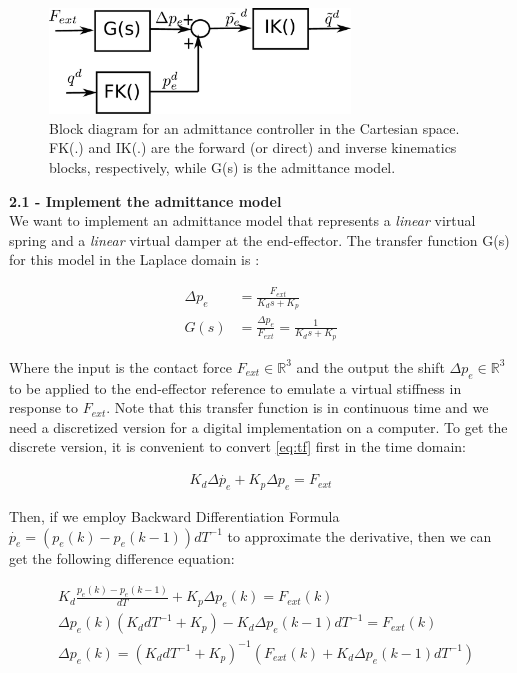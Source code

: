 \documentclass[11pt]{article}
\newcommand{\Rnum}{\mathbb{R}} %
\begin{document}
\begin{figure}[bht]
	\centering
	\includegraphics[width=8cm]{pics/admittanceControl.pdf}
	\caption{Block diagram for an admittance controller in the Cartesian space. FK(.) and IK(.) are the forward (or direct) and inverse kinematics blocks, respectively, while G(s) is the admittance model.}
	\label{fig:admittance}
\end{figure}

\textbf{2.1 - Implement the admittance model }\\
We want to implement an admittance model that represents a \textit{linear} virtual spring and a \textit{linear} virtual damper at the end-effector.
The transfer function G(s) for this model in the Laplace domain is :



\begin{align}
\label{eq:tf}
\Delta p_e &= \frac{ F_{ext} }{K_d s + K_p}\\
G(s)& = \frac{\Delta p_e}{F_{ext}} = \frac{ 1 }{K_d s + K_p} \nonumber
\end{align}


Where the input is the contact force $F_{ext}\in \Rnum^3$ and the output the shift  $\Delta p_e\in \Rnum^3$ to be applied to the end-effector reference to emulate a virtual stiffness in response to  $F_{ext}$. Note that this transfer function is in continuous time and we need a discretized version for a digital implementation on a computer. To get the discrete version, it is convenient to convert \eqref{eq:tf} first in the time domain:

\begin{align*}
K_d \Delta\dot{ p_e} + K_p{\Delta p_e}  =  F_{ext}  
\end{align*}
 
Then, if  we  employ Backward Differentiation Formula $\dot{p_e} = (p_e(k)- p_e(k-1))dT^{-1}$ to approximate the derivative, then we can get the following difference equation:

\begin{align*}
&K_d \frac{p_e(k)- p_e(k-1)}{dT}  + K_p \Delta p_e(k)  =  F_{ext}(k)  \\
&\Delta p_e(k) (K_d dT^{-1} + K_p ) - K_d \Delta p_e(k-1)dT^{-1} =  F_{ext}(k)\\
&\Delta p_e(k) =  (K_d dT^{-1} + K_p )^{-1} (F_{ext}(k) + K_d \Delta p_e(k-1)dT^{-1})
\end{align*}
\end{document}
